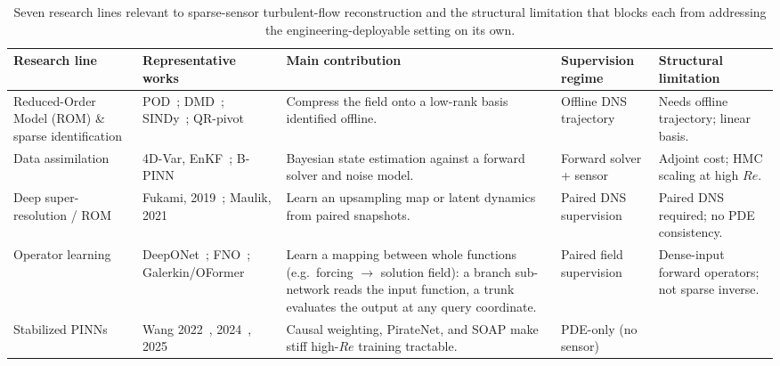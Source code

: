 \begin{table}[!htbp]
    \centering
    \caption{Seven research lines relevant to sparse-sensor turbulent-flow reconstruction and the structural limitation that blocks each from addressing the engineering-deployable setting on its own.}
    \label{tab:lit_summary}
    \footnotesize
    \setlength{\tabcolsep}{3pt}
    \renewcommand{\arraystretch}{1.1}
    \begin{tabularx}{\textwidth}{
        >{\raggedright\arraybackslash}p{2.0cm}
        >{\raggedright\arraybackslash}p{3.4cm}
        >{\raggedright\arraybackslash}X
        >{\raggedright\arraybackslash}p{1.9cm}
        >{\raggedright\arraybackslash}p{2.3cm}
    }
    \toprule
    \textbf{Research line} & \textbf{Representative works} & \textbf{Main contribution} & \textbf{Supervision regime} & \textbf{Structural limitation} \\
    \midrule
    Reduced-Order Model (ROM) \& sparse identification
    & POD~\cite{Sirovich1987POD}; DMD~\cite{Schmid2010DMD}; SINDy~\cite{Brunton2016SINDy}; QR-pivot~\cite{Manohar2018PNAS}
    & Compress the field onto a low-rank basis identified offline.
    & Offline DNS trajectory
    & Needs offline trajectory; linear basis. \\
    \midrule
    Data assimilation
    & 4D-Var, EnKF~\cite{Asch2016DA}; B-PINN~\cite{Yang2021JCP}
    & Bayesian state estimation against a forward solver and noise model.
    & Forward solver + sensor
    & Adjoint cost; HMC scaling at high $Re$. \\
    \midrule
    Deep super-resolution / ROM
    & Fukami, 2019~\cite{Fukami2019JFM}; Maulik, 2021~\cite{Maulik2021NN}
    & Learn an upsampling map or latent dynamics from paired snapshots.
    & Paired DNS supervision
    & Paired DNS required; no PDE consistency. \\
    \midrule
    Operator learning
    & DeepONet~\cite{Lu2021NMI}; FNO~\cite{Li2021FNO}; Galerkin/OFormer~\cite{Cao2021Galerkin, Li2023OFormer}
    & Learn a mapping between whole functions (e.g.\ forcing $\to$ solution field): a branch sub-network reads the input function, a trunk evaluates the output at any query coordinate.
    & Paired field supervision
    & Dense-input forward operators; not sparse inverse. \\
    \midrule
    Stabilized PINNs
    & Wang 2022~\cite{wang2022respectingcausality}, 2024~\cite{Wang2024JMLR}, 2025~\cite{wang2025gradientalignmentpinns}
    & Causal weighting, PirateNet, and SOAP make stiff high-$Re$ training tractable.
    & PDE-only (no sensor)

\end{tabularx}
\end{table}
